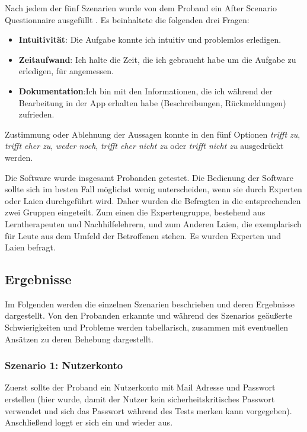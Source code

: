 Nach jedem der fünf Szenarien wurde von dem Proband ein After Scenario Questionnaire ausgefüllt . Es beinhaltete die folgenden drei Fragen:
\begin{itemize}
	\item \textbf{Intuitivität}: Die Aufgabe konnte ich intuitiv und problemlos erledigen.
	\item \textbf{Zeitaufwand}: Ich halte die Zeit, die ich gebraucht habe um die Aufgabe zu erledigen, für angemessen.
	\item \textbf{Dokumentation}:Ich bin mit den Informationen, die ich während der Bearbeitung in der App erhalten habe (Beschreibungen, Rückmeldungen) zufrieden.
\end{itemize}

Zustimmung oder Ablehnung der Aussagen konnte in den fünf Optionen \textit{trifft zu}, \textit{trifft eher zu}, \textit{weder noch}, \textit{trifft eher nicht zu} oder \textit{trifft nicht zu} ausgedrückt werden.

Die Software wurde insgesamt  Probanden getestet. Die Bedienung der Software sollte sich im besten Fall möglichst wenig unterscheiden, wenn sie durch Experten oder Laien durchgeführt wird. Daher wurden die Befragten in die entsprechenden zwei Gruppen eingeteilt. Zum einen die Expertengruppe, bestehend aus Lerntherapeuten und Nachhilfelehrern, und zum Anderen Laien, die exemplarisch für Leute aus dem Umfeld der Betroffenen stehen. Es wurden  Experten und  Laien befragt.\\

\subsection{Ergebnisse}

Im Folgenden werden die einzelnen Szenarien beschrieben und deren Ergebnisse dargestellt. Von den Probanden erkannte und während des Szenarios geäußerte Schwierigkeiten und Probleme werden tabellarisch, zusammen mit eventuellen Ansätzen zu deren Behebung dargestellt.

\subsubsection{Szenario 1: Nutzerkonto}

Zuerst sollte der Proband ein Nutzerkonto mit Mail Adresse und Passwort erstellen (hier wurde, damit der Nutzer kein sicherheitskritisches Passwort verwendet und sich das Passwort während des Tests merken kann  vorgegeben). Anschließend loggt er sich ein und wieder aus.

